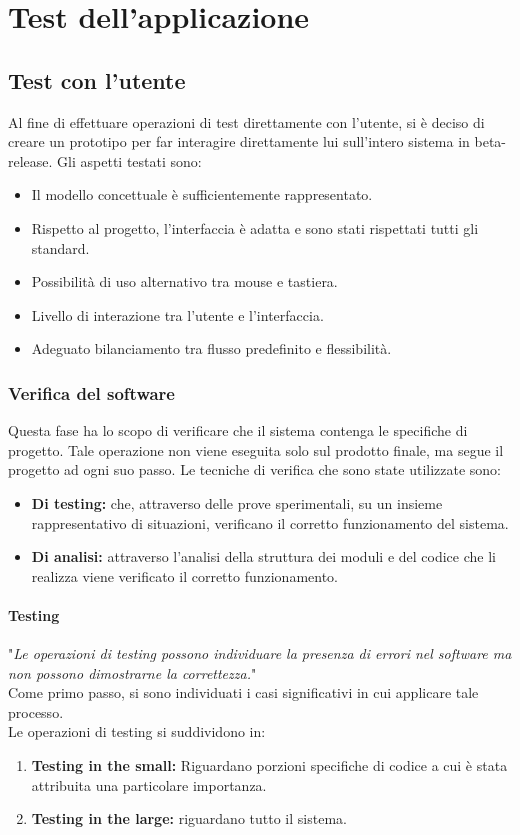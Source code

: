 \documentclass[a4paper,final,12pt]{report}
\begin{document}
\chapter{Test dell'applicazione}

\section{Test con l'utente}
Al fine di effettuare operazioni di test direttamente con l'utente, si è deciso di creare un prototipo per far interagire direttamente lui sull'intero sistema in beta-release.
Gli aspetti testati sono:
\begin{itemize}
\item Il modello concettuale è sufficientemente rappresentato.
\item Rispetto al progetto, l'interfaccia è adatta e sono stati rispettati tutti gli standard.
\item Possibilità di uso alternativo tra mouse e tastiera.
\item Livello di interazione tra l'utente e l'interfaccia.
\item Adeguato bilanciamento tra flusso predefinito e flessibilità.
\end{itemize}

\subsection{Verifica del software}
Questa fase ha lo scopo di verificare che il sistema contenga le specifiche di progetto. Tale operazione non viene eseguita solo sul prodotto finale, ma segue il progetto ad ogni suo passo.
Le tecniche di verifica che sono state utilizzate sono:
\begin{itemize}
\item \textbf{Di testing:} che, attraverso delle prove sperimentali, su un insieme rappresentativo di situazioni, verificano il corretto funzionamento del sistema. 
\item \textbf{Di analisi:} attraverso l'analisi della struttura dei moduli e del codice che li realizza viene verificato il corretto funzionamento. 
\end{itemize}

\subsubsection{Testing}
"\textit{Le operazioni di testing possono individuare la presenza di errori nel software ma non possono dimostrarne la correttezza.}"\cite{1}\\
Come primo passo, si sono individuati i casi significativi in cui applicare tale processo.\\
Le operazioni di testing si suddividono in:
\begin{enumerate}
\item \textbf{Testing in the small:} Riguardano porzioni specifiche di codice a cui è stata attribuita una particolare importanza.
\item \textbf{Testing in the large:} riguardano tutto il sistema.
\end{enumerate}
\end{document}
